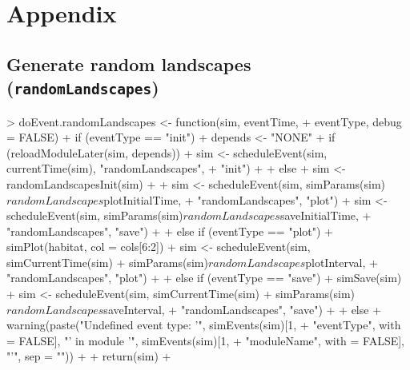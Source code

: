 \documentclass{article}
\begin{document}
\section{Appendix}
\renewcommand{\thesubsection}{\Alph{subsection}}

\subsection{Generate random landscapes (\texttt{randomLandscapes})}

\begin{Schunk}
\begin{Soutput}
> doEvent.randomLandscapes <- function(sim, eventTime, 
+     eventType, debug = FALSE) {
+     if (eventType == "init") {
+         depends <- "NONE"
+         if (reloadModuleLater(sim, depends)) {
+             sim <- scheduleEvent(sim, currentTime(sim), "randomLandscapes", 
+                 "init")
+         }
+         else {
+             sim <- randomLandscapesInit(sim)
+         }
+         sim <- scheduleEvent(sim, simParams(sim)$randomLandscapes$plotInitialTime, 
+             "randomLandscapes", "plot")
+         sim <- scheduleEvent(sim, simParams(sim)$randomLandscapes$saveInitialTime, 
+             "randomLandscapes", "save")
+     }
+     else if (eventType == "plot") {
+         simPlot(habitat, col = cols[6:2])
+         sim <- scheduleEvent(sim, simCurrentTime(sim) + simParams(sim)$randomLandscapes$plotInterval, 
+             "randomLandscapes", "plot")
+     }
+     else if (eventType == "save") {
+         simSave(sim)
+         sim <- scheduleEvent(sim, simCurrentTime(sim) + simParams(sim)$randomLandscapes$saveInterval, 
+             "randomLandscapes", "save")
+     }
+     else {
+         warning(paste("Undefined event type: '", simEvents(sim)[1, 
+             "eventType", with = FALSE], "' in module '", simEvents(sim)[1, 
+             "moduleName", with = FALSE], "'", sep = ""))
+     }
+     return(sim)
+ }


\end{Soutput}
\end{Schunk}
\end{document}
